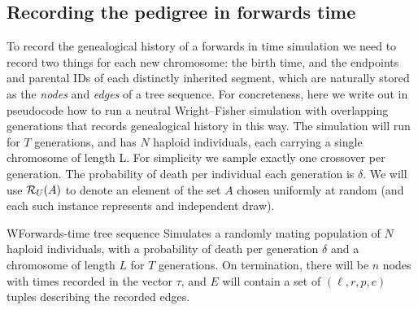 \documentclass{article}
\begin{document}
\subsection*{Recording the pedigree in forwards time}

To record the genealogical history of a forwards in time simulation
we need to record two things for each new chromosome:
the birth time, and the endpoints and parental IDs of each distinctly inherited segment,
which are naturally stored as the \emph{nodes} and \emph{edges} of a tree sequence.
For concreteness, here we write out in pseudocode how to run a neutral Wright--Fisher simulation
with overlapping generations that records genealogical history in this way.
The simulation will run for $T$ generations,
and has $N$ haploid individuals, each carrying a single chromosome of length L.
For simplicity we sample exactly one crossover per generation.
The probability of death per individual each generation is $\delta$.
We will use
$\mathcal{R}_U(A)$ to denote an element of the set $A$ chosen uniformly at random 
(and each such instance represents and independent draw).

\begin{taocpalg}{W}{Forwards-time tree sequence}
{Simulates a randomly mating population of $N$ haploid individuals,
with a probability of death per generation $\delta$ and a chromosome of length
$L$ for $T$ generations. On termination, there will be $n$ nodes with times recorded
in the vector $\tau$, and $E$ will contain a set of $(\ell, r, p, c)$ tuples
describing the recorded edges.
}




\algstep{W4.}{Mortality.}{ If $\randomuniform([0, 1)) \geq \delta$ go to \algref{W8}.
}


\algstep{W6.}{Choose parents.}{Set $a \leftarrow \randomuniform(\{0, \dots, N - 1\})$,
    $b \leftarrow \randomuniform(\{0, \dots, N - 1\})$ and $x \leftarrow \randomuniform([0, L))$.
}



\end{taocpalg}
\end{document}
